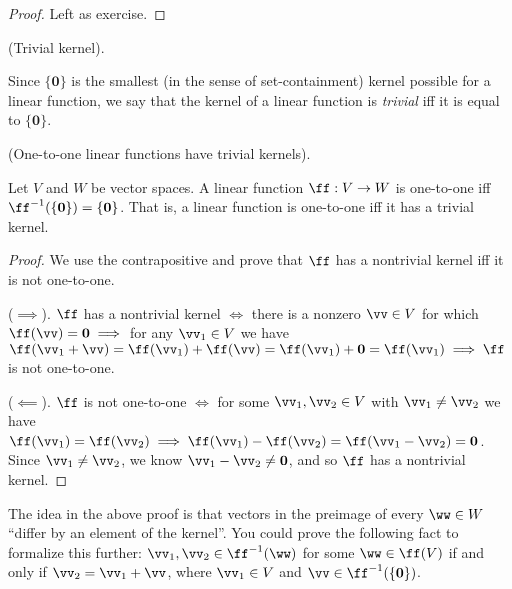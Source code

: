 \begin{proof}
   Left as exercise.
\end{proof}

\begin{defn}
    (Trivial kernel).
    
    Since $\{\mathbf{0}\}$ is the smallest (in the sense of set-containment) kernel possible for a linear function, we say that the kernel of a linear function is \textit{trivial} iff it is equal to $\{\mathbf{0}\}$.
\end{defn}

\begin{theorem}
\label{ch::lin_alg::thm::linear_fn_1-1_trivial_kernel}
    (One-to-one linear functions have trivial kernels). 
    
    Let $V$ and $W$ be vector spaces. A linear function $\ff:V \rightarrow W$ is one-to-one iff $\ff^{-1}(\{\mathbf{0}\}) = \{\mathbf{0}\}$. That is, a linear function is one-to-one iff it has a trivial kernel.
\end{theorem}

\begin{proof}
    We use the contrapositive and prove that $\ff$ has a nontrivial kernel iff it is not one-to-one.
    
    ($\implies$). $\ff$ has a nontrivial kernel $\iff$ there is a nonzero $\vv \in V$ for which $\ff(\vv) = \mathbf{0} \implies$ for any $\vv_1 \in V$ we have $\ff(\vv_1 + \vv) = \ff(\vv_1) + \ff(\vv) = \ff(\vv_1) + \mathbf{0} = \ff(\vv_1) \implies \ff$ is not one-to-one.
    
    ($\impliedby$). $\ff$ is not one-to-one $\iff$ for some $\vv_1, \vv_2 \in V$ with $\vv_1 \neq \vv_2$ we have $\ff(\vv_1) = \ff(\vv_2) \implies \ff(\vv_1) - \ff(\vv_2) = \ff(\vv_1 - \vv_2) = \mathbf{0}$. Since $\vv_1 \neq \vv_2$, we know $\vv_1 - \vv_2 \neq \mathbf{0}$, and so $\ff$ has a nontrivial kernel.
\end{proof}

\begin{remark}
    The idea in the above proof is that vectors in the preimage of every $\ww \in W$ ``differ by an element of the kernel''. You could prove the following fact to formalize this further: $\vv_1, \vv_2 \in \ff^{-1}(\ww)$ for some $\ww \in \ff(V)$ if and only if $\vv_2 = \vv_1 + \vv$, where $\vv_1 \in V$ and $\vv \in \ff^{-1}(\{\mathbf{0}\})$.
\end{remark}

